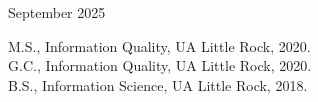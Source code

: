 \begin{titlepage}
\begin{tabular}{ll}
\end{tabular}

\vspace{3em}

\begin{center}
September 2025

\vspace{1em}

\tamudepartment \par
\vspace{1em}
M.S., Information Quality, UA Little Rock, 2020.\\
G.C., Information Quality, UA Little Rock, 2020.\\
B.S., Information Science, UA Little Rock, 2018.\\
\par\end{center}
\end{titlepage}
\pagebreak{}





